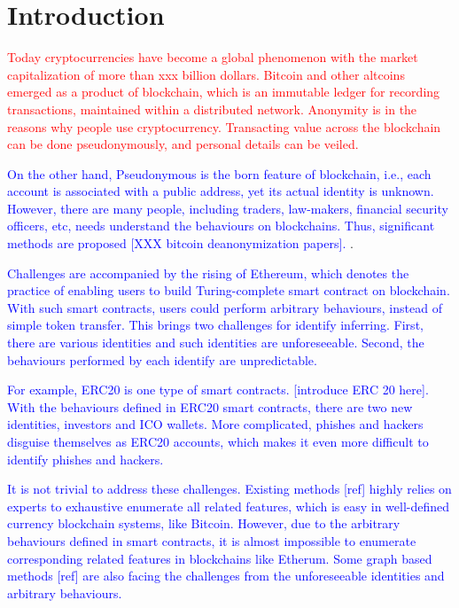 \section{Introduction}
\textcolor{red}{
Today cryptocurrencies have become a global phenomenon with the market capitalization of more than xxx billion dollars. Bitcoin and other altcoins emerged as a product of blockchain, which is an immutable ledger for recording transactions, maintained within a distributed network. Anonymity is in the reasons why people use cryptocurrency. Transacting value across the blockchain can be done pseudonymously, and personal details can be veiled.
}

\textcolor{blue}{
On the other hand, 
Pseudonymous is the born feature of
blockchain, i.e., each account is associated with a public address, yet its
actual identity is unknown. However, there are many people, including traders,
law-makers, financial security officers, etc, needs understand the behaviours on
blockchains. Thus, significant methods are proposed [XXX bitcoin deanonymization
papers]. 
}.

\textcolor{blue}{
Challenges are accompanied by the rising of Ethereum, which denotes the
practice of enabling users to build Turing-complete smart contract on
blockchain. With such smart contracts, users could perform arbitrary
behaviours, instead of simple token transfer. This brings two challenges for
identify inferring.
First, there are various identities and such identities are unforeseeable.
Second, the behaviours performed by each identify are unpredictable.
}

\textcolor{blue}{
For example, ERC20 is one type of smart contracts. [introduce ERC 20 here].
With the behaviours defined in ERC20 smart contracts, there are two new
identities, investors and ICO wallets. More complicated, phishes and hackers
disguise themselves as ERC20 accounts, which makes it even more difficult to
identify phishes and hackers.
}


\textcolor{blue}{
It is not trivial to address these challenges. Existing methods [ref] highly
relies on experts to exhaustive enumerate all related features, which is easy
in well-defined currency blockchain systems, like Bitcoin. However, due to the arbitrary behaviours
defined in smart contracts, it is
almost impossible to enumerate corresponding related features in blockchains
like Etherum. Some graph based methods [ref] are also facing the challenges from
the unforeseeable identities and arbitrary behaviours.
}


